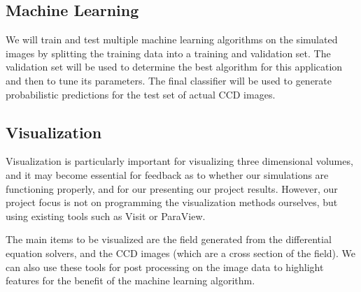 
\subsection{Machine Learning}
We will train and test multiple machine learning algorithms on the simulated images by splitting the training data into a training and validation set.  The validation set will be used to determine the best algorithm for this application and then to tune its parameters.  The final classifier will be used to generate probabilistic predictions for the test set of actual CCD images.
 

\subsection{Visualization}
Visualization is particularly important for visualizing three dimensional volumes, and it may become essential for feedback as to whether our simulations are functioning properly, and for our presenting our project results. However, our project focus is not on programming the visualization methods ourselves, but using existing tools such as Visit or ParaView.

The main items to be visualized are the field generated from the differential equation solvers, and the CCD images (which are a cross section of the field). We can also use these tools for post processing on the image data to highlight features for the benefit of the machine learning algorithm.

